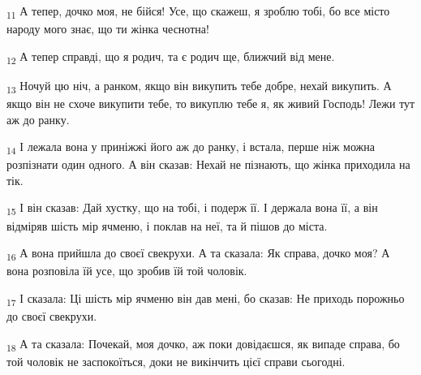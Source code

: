 \begin{tcolorbox}
\textsubscript{11} А тепер, дочко моя, не бійся! Усе, що скажеш, я зроблю тобі, бо все місто народу мого знає, що ти жінка чеснотна!
\end{tcolorbox}
\begin{tcolorbox}
\textsubscript{12} А тепер справді, що я родич, та є родич ще, ближчий від мене.
\end{tcolorbox}
\begin{tcolorbox}
\textsubscript{13} Ночуй цю ніч, а ранком, якщо він викупить тебе добре, нехай викупить. А якщо він не схоче викупити тебе, то викуплю тебе я, як живий Господь! Лежи тут аж до ранку.
\end{tcolorbox}
\begin{tcolorbox}
\textsubscript{14} І лежала вона у приніжжі його аж до ранку, і встала, перше ніж можна розпізнати один одного. А він сказав: Нехай не пізнають, що жінка приходила на тік.
\end{tcolorbox}
\begin{tcolorbox}
\textsubscript{15} І він сказав: Дай хустку, що на тобі, і подерж її. І держала вона її, а він відміряв шість мір ячменю, і поклав на неї, та й пішов до міста.
\end{tcolorbox}
\begin{tcolorbox}
\textsubscript{16} А вона прийшла до своєї свекрухи. А та сказала: Як справа, дочко моя? А вона розповіла їй усе, що зробив їй той чоловік.
\end{tcolorbox}
\begin{tcolorbox}
\textsubscript{17} І сказала: Ці шість мір ячменю він дав мені, бо сказав: Не приходь порожньо до своєї свекрухи.
\end{tcolorbox}
\begin{tcolorbox}
\textsubscript{18} А та сказала: Почекай, моя дочко, аж поки довідаєшся, як випаде справа, бо той чоловік не заспокоїться, доки не викінчить цієї справи сьогодні.
\end{tcolorbox}
